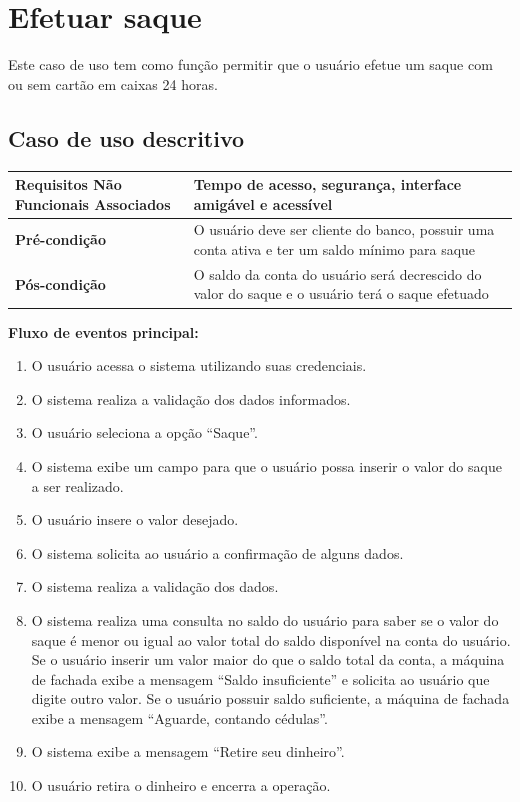 \section{Efetuar saque}

Este caso de uso tem como função permitir que o usuário efetue um saque com ou sem cartão em caixas 24 horas.

\subsection{Caso de uso descritivo}

\begin{table}[h]
  \centering
  \begin{tabular}{|p{4cm} | p{10cm} |}
      \hline
      \small{\textbf{Requisitos Não Funcionais Associados}}	& Tempo de acesso, segurança, interface amigável e acessível	\\ \hline
      \small{\textbf{Pré-condição}}	&	O usuário deve ser cliente do banco, possuir uma conta ativa e ter um saldo mínimo para saque	\\ \hline
      \small{\textbf{Pós-condição}}	&	O saldo da conta do usuário será decrescido do valor do saque e o usuário terá o saque efetuado	\\ \hline
    \end{tabular}
\end{table}

\textbf{Fluxo de eventos principal:}

\begin{enumerate}
  \item O usuário acessa o sistema utilizando suas credenciais.
  \item O sistema realiza a validação dos dados informados.
  \item O usuário seleciona a opção ``Saque''.
  \item O sistema exibe um campo para que o usuário possa inserir o valor do saque a ser realizado.
  \item O usuário insere o valor desejado.
  \item O sistema solicita ao usuário a confirmação de alguns dados.
  \item O sistema realiza a validação dos dados.
  \item O sistema realiza uma consulta no saldo do usuário para saber se o valor do saque é menor ou igual ao valor total do saldo disponível na conta do usuário.
    \subitem Se o usuário inserir um valor maior do que o saldo total da conta, a máquina de fachada exibe a mensagem ``Saldo insuficiente'' e solicita ao usuário que digite outro valor.
    \subitem Se o usuário possuir saldo suficiente, a máquina de fachada exibe a mensagem ``Aguarde, contando cédulas''.
  \item O sistema exibe a mensagem ``Retire seu dinheiro''.
  \item O usuário retira o dinheiro e encerra a operação.
\end{enumerate}

